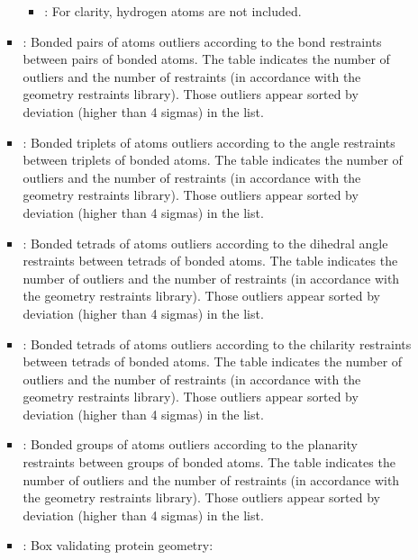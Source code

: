 \begin{itemize}
\begin{itemize}
\begin{itemize}
\begin{itemize}
           \item {}: For clarity, hydrogen atoms are not included.
          \end{itemize}
          
         \item {}: Bonded pairs of atoms outliers according to the bond restraints between pairs of bonded atoms. The  table indicates the number of outliers and the number of restraints (in accordance with the geometry restraints library). Those outliers appear sorted by deviation (higher than 4 sigmas) in the  list.
         \item {}: Bonded triplets of atoms outliers according to the angle restraints between triplets of bonded atoms. The  table indicates the number of outliers and the number of restraints (in accordance with the geometry restraints library). Those outliers appear sorted by deviation (higher than 4 sigmas) in the  list.
         \item {}: Bonded tetrads of atoms outliers  according to the dihedral angle restraints between tetrads of bonded atoms. The  table indicates the number of outliers and the number of restraints (in accordance with the geometry restraints library). Those outliers appear sorted by deviation (higher than 4 sigmas) in the  list.
         \item {}: Bonded tetrads of atoms outliers according to the chilarity restraints between tetrads of bonded atoms. The  table indicates the number of outliers and the number of restraints (in accordance with the geometry restraints library). Those outliers appear sorted by deviation (higher than 4 sigmas) in the  list.
         \item {}: Bonded groups of atoms outliers according to the planarity restraints between groups of bonded atoms. The  table indicates the number of outliers and the number of restraints (in accordance with the geometry restraints library). Those outliers appear sorted by deviation (higher than 4 sigmas) in the  list.
         \item {}: Box validating protein geometry:
         \begin{itemize}

\end{itemize}
\end{itemize}
\end{itemize}
\end{itemize}
